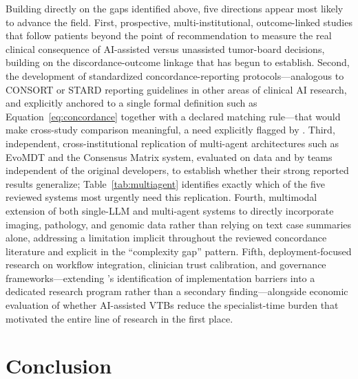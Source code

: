 \documentclass[acmsmall,screen=true,review=false,nonacm=true]{acmart}
\begin{document}
Building directly on the gaps identified above, five directions appear most likely to advance the field. First, prospective, multi-institutional, outcome-linked studies that follow patients beyond the point of recommendation to measure the real clinical consequence of AI-assisted versus unassisted tumor-board decisions, building on the discordance-outcome linkage that \citet{aliyev2026} has begun to establish. Second, the development of standardized concordance-reporting protocols---analogous to CONSORT or STARD reporting guidelines in other areas of clinical AI research, and explicitly anchored to a single formal definition such as Equation~\eqref{eq:concordance} together with a declared matching rule---that would make cross-study comparison meaningful, a need explicitly flagged by \citet{carl2024}. Third, independent, cross-institutional replication of multi-agent architectures such as EvoMDT and the Consensus Matrix system, evaluated on data and by teams independent of the original developers, to establish whether their strong reported results generalize; Table~\ref{tab:multiagent} identifies exactly which of the five reviewed systems most urgently need this replication. Fourth, multimodal extension of both single-LLM and multi-agent systems to directly incorporate imaging, pathology, and genomic data rather than relying on text case summaries alone, addressing a limitation implicit throughout the reviewed concordance literature and explicit in the ``complexity gap'' pattern. Fifth, deployment-focused research on workflow integration, clinician trust calibration, and governance frameworks---extending \citeauthor{wu2026}'s \citeyearpar{wu2026} identification of implementation barriers into a dedicated research program rather than a secondary finding---alongside economic evaluation of whether AI-assisted VTBs reduce the specialist-time burden that motivated the entire line of research in the first place.

\section{Conclusion}
\label{sec:conclusion}
\end{document}
